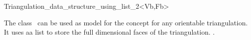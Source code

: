 

\begin{ccRefClass}{Triangulation_data_structure_using_list_2<Vb,Fb>}  %

\ccDefinition
  
The class \ccRefName\ can be used as model
for the  concept
 for any
orientable triangulation. It uses aa \stl list to store the
full dimensional faces of the triangulation.
.


\ccIsModel




\end{ccRefClass}


